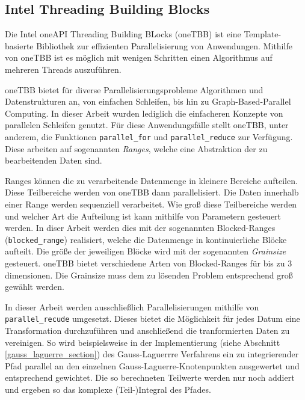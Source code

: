 \subsection{Intel Threading Building Blocks}


Die Intel\textsuperscript{\textcopyright} oneAPI Threading Building BLocks (oneTBB) ist eine Template-basierte Bibliothek zur effizienten Parallelisierung von Anwendungen. 
Mithilfe von oneTBB ist es möglich mit wenigen Schritten einen Algorithmus auf mehreren Threads auszuführen.

oneTBB bietet für diverse Parallelisierungsprobleme  Algorithmen und Datenstrukturen an, von einfachen Schleifen, bis hin zu Graph-Based-Parallel Computing.
In dieser Arbeit wurden lediglich die einfacheren Konzepte von parallelen Schleifen genutzt. Für diese Anwendungsfälle stellt oneTBB, unter anderem, die Funktionen \texttt{parallel\_for} und \texttt{parallel\_reduce}
zur Verfügung. Diese arbeiten auf sogenannten \textit{Ranges}, welche eine Abstraktion der zu bearbeitenden Daten sind.

Ranges können die zu verarbeitende Datenmenge in kleinere Bereiche aufteilen. Diese Teilbereiche werden von oneTBB dann parallelisiert. Die Daten innerhalb einer Range werden sequenziell verarbeitet. 
Wie groß diese Teilbereiche werden und welcher Art die Aufteilung ist kann mithilfe von Parametern gesteuert werden. In diser Arbeit werden dies mit der sogenannten Blocked-Ranges (\texttt{blocked\_range}) realisiert, welche die Datenmenge in kontinuierliche Blöcke aufteilt. Die größe der jeweiligen Blöcke wird mit der sogenannten \textit{Grainsize} gesteuert.
oneTBB bietet verschiedene Arten von Blocked-Ranges für bis zu 3 dimensionen. Die Grainsize muss dem zu lösenden Problem entsprechend groß gewählt werden.

\begin{center}
    
\end{center}

In dieser Arbeit werden ausschließlich Parallelisierungen mithilfe von \texttt{parallel\_recude} umgesetzt.
Dieses bietet die Möglichkeit für jedes Datum eine Transformation durchzuführen und anschließend die tranformierten Daten zu vereinigen. 
So wird beispielsweise in der Implementierung (siehe Abschnitt \ref{gauss_laguerre_section}) des Gauss-Laguerrre Verfahrens ein zu integrierender Pfad parallel an den einzelnen Gauss-Laguerre-Knotenpunkten ausgewertet und entsprechend gewichtet.
Die so berechneten Teilwerte werden nur noch addiert und ergeben so das komplexe (Teil-)Integral des Pfades. 

